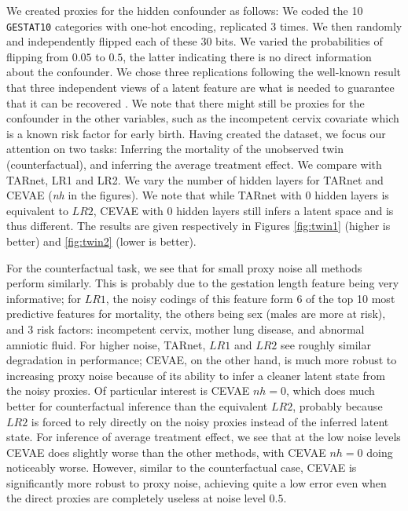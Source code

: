 \documentclass{article}
\begin{document}
We created proxies for the hidden confounder as follows: We coded the 10 \texttt{GESTAT10}  categories with one-hot encoding, replicated 3 times. We then randomly and independently flipped each of these 30 bits. We varied the probabilities of flipping from $0.05$ to $0.5$,  the latter indicating there is no direct information about the confounder. We chose three replications following the well-known result that three independent views of a latent feature are what is needed to guarantee that it can be recovered \citep{kruskal1976more,allman2009identifiability,anandkumar2014tensor}. We note that there might still be proxies for the confounder in the other variables, such as the incompetent cervix covariate which is a known risk factor for early birth.
Having created the dataset, we focus our attention on two tasks: Inferring the mortality of the unobserved twin (counterfactual), and inferring the average treatment effect. We compare with TARnet, LR1 and LR2. We vary the number of hidden layers for TARnet and CEVAE (\emph{nh} in the figures). We note that while TARnet with 0 hidden layers is equivalent to $LR2$, CEVAE with 0 hidden layers still infers a latent space and is thus different. The results are given respectively in Figures \ref{fig:twin1} (higher is better) and \ref{fig:twin2} (lower is better).

For the counterfactual task, we see that for small proxy noise all methods perform similarly. This is probably due to the gestation length feature being very informative; for $LR1$, the noisy codings of this feature form 6 of the top 10 most predictive features for mortality, the others being sex (males are more at risk), and 3 risk factors: incompetent cervix, mother lung disease, and abnormal amniotic fluid.
For higher noise, TARnet, $LR1$ and $LR2$ see roughly similar degradation in performance;  CEVAE, on the other hand, is much more robust to increasing proxy noise because of its ability to infer a cleaner latent state from the noisy proxies. Of particular interest is CEVAE $nh=0$, which does much better for counterfactual inference than the equivalent $LR2$, probably because $LR2$ is forced to rely directly on the noisy proxies instead of the inferred latent state. 
For inference of average treatment effect, we see that at the low noise levels CEVAE does slightly worse than the other methods, with CEVAE $nh=0$ doing noticeably worse. However, similar to the counterfactual case, CEVAE is significantly more robust to proxy noise, achieving quite a low error even when the direct proxies are completely useless at noise level $0.5$.
\end{document}
